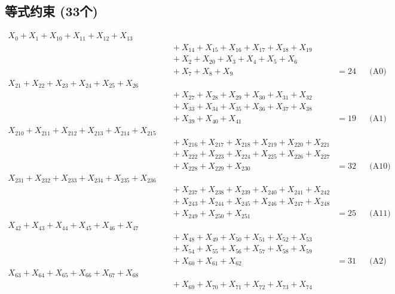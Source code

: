 \documentclass[a4paper,10pt]{article}
\begin{document}
\subsection{等式约束 (33个)}

\allowdisplaybreaks
{\small\begin{align}
X_{0} + X_{1} + X_{10} + X_{11} + X_{12} + X_{13} \\[0.5ex]
&\quad  + X_{14} + X_{15} + X_{16} + X_{17} + X_{18} + X_{19} \\[0.5ex]
&\quad  + X_{2} + X_{20} + X_{3} + X_{4} + X_{5} + X_{6} \\[0.5ex]
&\quad  + X_{7} + X_{8} + X_{9} &= 24 && \text{(A0)} \\
X_{21} + X_{22} + X_{23} + X_{24} + X_{25} + X_{26} \\[0.5ex]
&\quad  + X_{27} + X_{28} + X_{29} + X_{30} + X_{31} + X_{32} \\[0.5ex]
&\quad  + X_{33} + X_{34} + X_{35} + X_{36} + X_{37} + X_{38} \\[0.5ex]
&\quad  + X_{39} + X_{40} + X_{41} &= 19 && \text{(A1)} \\
X_{210} + X_{211} + X_{212} + X_{213} + X_{214} + X_{215} \\[0.5ex]
&\quad  + X_{216} + X_{217} + X_{218} + X_{219} + X_{220} + X_{221} \\[0.5ex]
&\quad  + X_{222} + X_{223} + X_{224} + X_{225} + X_{226} + X_{227} \\[0.5ex]
&\quad  + X_{228} + X_{229} + X_{230} &= 32 && \text{(A10)} \\
X_{231} + X_{232} + X_{233} + X_{234} + X_{235} + X_{236} \\[0.5ex]
&\quad  + X_{237} + X_{238} + X_{239} + X_{240} + X_{241} + X_{242} \\[0.5ex]
&\quad  + X_{243} + X_{244} + X_{245} + X_{246} + X_{247} + X_{248} \\[0.5ex]
&\quad  + X_{249} + X_{250} + X_{251} &= 25 && \text{(A11)} \\
X_{42} + X_{43} + X_{44} + X_{45} + X_{46} + X_{47} \\[0.5ex]
&\quad  + X_{48} + X_{49} + X_{50} + X_{51} + X_{52} + X_{53} \\[0.5ex]
&\quad  + X_{54} + X_{55} + X_{56} + X_{57} + X_{58} + X_{59} \\[0.5ex]
&\quad  + X_{60} + X_{61} + X_{62} &= 31 && \text{(A2)} \\
X_{63} + X_{64} + X_{65} + X_{66} + X_{67} + X_{68} \\[0.5ex]
&\quad  + X_{69} + X_{70} + X_{71} + X_{72} + X_{73} + X_{74} \\[0.5ex]

\end{align}}
\end{document}
